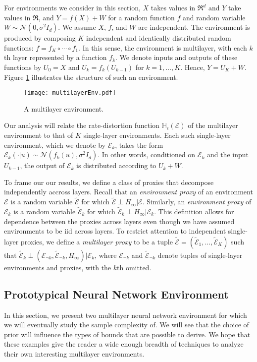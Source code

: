 \documentclass[twoside,11pt]{article}
\def\environment{\mathcal{E}}
\def\proxy{\tilde{\environment}}
\def\H{\mathbb{H}}
\begin{document}
For environments we consider in this section, $X$ takes values in $\Re^d$ and $Y$ take values in $\Re$, and $Y = f(X) + W$ for a random function $f$ and random variable $W \sim \mathcal{N}(0, \sigma^2 I_d)$.  We assume $X$, $f$, and $W$ are independent.  The environment is produced by composing $K$ independent and identically distributed random functions: $f = f_K \circ \cdots \circ f_1$.  In this sense, the environment is multilayer, with each $k$th layer represented by a function $f_k$.  We denote inputs and outputs of these functions by $U_0=X$ and $U_k=f_k(U_{k-1})$ for $k=1,\ldots,K$.  Hence, $Y = U_K + W$.  Figure \ref{fig:multilayer-environment} illustrates the structure of such an environment.

\begin{figure}[!ht]
\centering
\texttt{[image: multilayerEnv.pdf]}
\caption{A multilayer environment.}
\label{fig:multilayer-environment}
\end{figure}

Our analysis will relate the rate-distortion function $\H_\epsilon(\environment)$ of the multilayer environment to that of $K$ single-layer environments.  Each such single-layer environment, which we denote by $\environment_k$, takes the form $\environment_k(\cdot|u) \sim \mathcal{N}(f_k(u), \sigma^2 I_d)$.  In other words, conditioned on $\environment_k$ and the input $U_{k-1}$, the output of $\environment_k$ is distributed according to $U_k + W$.

To frame our our results, we define a class of proxies that decompose independently accross layers.  Recall that an {\it environment proxy} of an environment $\environment$ is a random variable $\proxy$ for which $\proxy \perp H_\infty | \environment$.  Similarly, an {\it environment proxy} of $\environment_k$ is a random variable $\proxy_k$ for which $\proxy_k \perp H_\infty | \environment_k$.  This definition allows for dependence between the proxies across layers even though we have assumed environments to be iid across layers.  To restrict attention to independent single-layer proxies, we define a {\it multilayer proxy} to be a tuple $\proxy = (\proxy_1,\ldots,\proxy_K)$ such that $\proxy_k \perp (\environment_{\lnot k}, \proxy_{\lnot k}, H_\infty) | \environment_k$, where $\environment_{\lnot k}$ and $\proxy_{\lnot k}$ denote tuples of single-layer environments and proxies, with the $k$th omitted.

\subsection{Prototypical Neural Network Environment}
In this section, we present two multilayer neural network environment for which  we will eventually study the sample complexity of.  We will see that the choice of prior will influence the types of bounds that are possible to derive.  We hope that these examples give the reader a wide enough breadth of techniques to analyze their own interesting multilayer environments.
\end{document}
